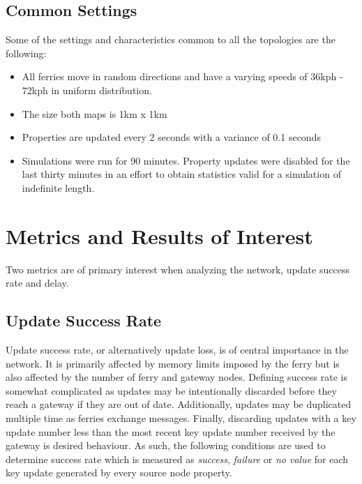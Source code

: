 \subsection{Common Settings}
\label{sec:commonsettings}

Some of the settings and characteristics common to all the topologies are the following:
\begin{itemize}
	\item All ferries move in random directions and have a varying speeds of 36kph - 72kph in uniform distribution.
	\item The size both maps is 1km x 1km
	\item Properties are updated every 2 seconds with a variance of 0.1 seconds
	\item Simulations were run for 90 minutes. 
	Property updates were disabled for the last thirty minutes in an effort to obtain statistics valid for a simulation of indefinite length. 
\end{itemize}

\section{Metrics and Results of Interest }
\label{sec:metrics}

Two metrics are of primary interest when analyzing the network, update success rate and delay.

\subsection{Update Success Rate}
\label{sec:packetloss}

Update success rate, or alternatively update loss, is of central importance in the network.
It is primarily affected by memory limits imposed by the ferry but is also affected by the number of ferry and gateway nodes.
Defining success rate is somewhat complicated as updates may be intentionally discarded before they reach a gateway if they are out of date.
Additionally, updates may be duplicated multiple time as ferries exchange messages.
Finally, discarding updates with a key update number less than the most recent key update number received by the gateway is desired behaviour.
As such, the following conditions are used to determine success rate which is measured as \emph{success}, \emph{failure} or \emph{no value} for each key update generated by every source node property.

